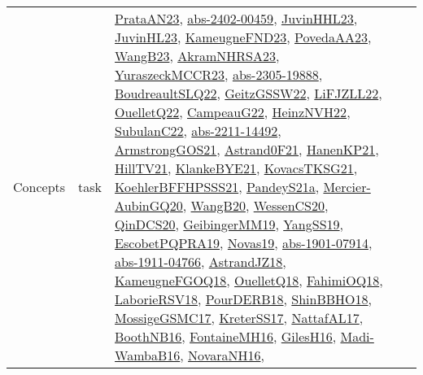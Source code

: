 {\begin{longtable}{llp{6cm}p{6cm}p{6cm}}
Concepts & task & \href{articles/PrataAN23.pdf}{PrataAN23}\cite{PrataAN23}, \href{articles/abs-2402-00459.pdf}{abs-2402-00459}\cite{abs-2402-00459}, \href{papers/JuvinHHL23.pdf}{JuvinHHL23}\cite{JuvinHHL23}, \href{papers/JuvinHL23.pdf}{JuvinHL23}\cite{JuvinHL23}, \href{papers/KameugneFND23.pdf}{KameugneFND23}\cite{KameugneFND23}, \href{papers/PovedaAA23.pdf}{PovedaAA23}\cite{PovedaAA23}, \href{papers/WangB23.pdf}{WangB23}\cite{WangB23}, \href{articles/AkramNHRSA23.pdf}{AkramNHRSA23}\cite{AkramNHRSA23}, \href{articles/YuraszeckMCCR23.pdf}{YuraszeckMCCR23}\cite{YuraszeckMCCR23}, \href{articles/abs-2305-19888.pdf}{abs-2305-19888}\cite{abs-2305-19888}, \href{papers/BoudreaultSLQ22.pdf}{BoudreaultSLQ22}\cite{BoudreaultSLQ22}, \href{papers/GeitzGSSW22.pdf}{GeitzGSSW22}\cite{GeitzGSSW22}, \href{papers/LiFJZLL22.pdf}{LiFJZLL22}\cite{LiFJZLL22}, \href{papers/OuelletQ22.pdf}{OuelletQ22}\cite{OuelletQ22}, \href{articles/CampeauG22.pdf}{CampeauG22}\cite{CampeauG22}, \href{articles/HeinzNVH22.pdf}{HeinzNVH22}\cite{HeinzNVH22}, \href{articles/SubulanC22.pdf}{SubulanC22}\cite{SubulanC22}, \href{articles/abs-2211-14492.pdf}{abs-2211-14492}\cite{abs-2211-14492}, \href{papers/ArmstrongGOS21.pdf}{ArmstrongGOS21}\cite{ArmstrongGOS21}, \href{papers/Astrand0F21.pdf}{Astrand0F21}\cite{Astrand0F21}, \href{papers/HanenKP21.pdf}{HanenKP21}\cite{HanenKP21}, \href{papers/HillTV21.pdf}{HillTV21}\cite{HillTV21}, \href{papers/KlankeBYE21.pdf}{KlankeBYE21}\cite{KlankeBYE21}, \href{papers/KovacsTKSG21.pdf}{KovacsTKSG21}\cite{KovacsTKSG21}, \href{articles/KoehlerBFFHPSSS21.pdf}{KoehlerBFFHPSSS21}\cite{KoehlerBFFHPSSS21}, \href{articles/PandeyS21a.pdf}{PandeyS21a}\cite{PandeyS21a}, \href{papers/Mercier-AubinGQ20.pdf}{Mercier-AubinGQ20}\cite{Mercier-AubinGQ20}, \href{papers/WangB20.pdf}{WangB20}\cite{WangB20}, \href{papers/WessenCS20.pdf}{WessenCS20}\cite{WessenCS20}, \href{articles/QinDCS20.pdf}{QinDCS20}\cite{QinDCS20}, \href{papers/GeibingerMM19.pdf}{GeibingerMM19}\cite{GeibingerMM19}, \href{papers/YangSS19.pdf}{YangSS19}\cite{YangSS19}, \href{articles/EscobetPQPRA19.pdf}{EscobetPQPRA19}\cite{EscobetPQPRA19}, \href{articles/Novas19.pdf}{Novas19}\cite{Novas19}, \href{articles/abs-1901-07914.pdf}{abs-1901-07914}\cite{abs-1901-07914}, \href{articles/abs-1911-04766.pdf}{abs-1911-04766}\cite{abs-1911-04766}, \href{papers/AstrandJZ18.pdf}{AstrandJZ18}\cite{AstrandJZ18}, \href{papers/KameugneFGOQ18.pdf}{KameugneFGOQ18}\cite{KameugneFGOQ18}, \href{papers/OuelletQ18.pdf}{OuelletQ18}\cite{OuelletQ18}, \href{articles/FahimiOQ18.pdf}{FahimiOQ18}\cite{FahimiOQ18}, \href{articles/LaborieRSV18.pdf}{LaborieRSV18}\cite{LaborieRSV18}, \href{articles/PourDERB18.pdf}{PourDERB18}\cite{PourDERB18}, \href{articles/ShinBBHO18.pdf}{ShinBBHO18}\cite{ShinBBHO18}, \href{papers/MossigeGSMC17.pdf}{MossigeGSMC17}\cite{MossigeGSMC17}, \href{articles/KreterSS17.pdf}{KreterSS17}\cite{KreterSS17}, \href{articles/NattafAL17.pdf}{NattafAL17}\cite{NattafAL17}, \href{papers/BoothNB16.pdf}{BoothNB16}\cite{BoothNB16}, \href{papers/FontaineMH16.pdf}{FontaineMH16}\cite{FontaineMH16}, \href{papers/GilesH16.pdf}{GilesH16}\cite{GilesH16}, \href{papers/Madi-WambaB16.pdf}{Madi-WambaB16}\cite{Madi-WambaB16}, \href{articles/NovaraNH16.pdf}{NovaraNH16}\cite{NovaraNH16}, 
\end{longtable}}
